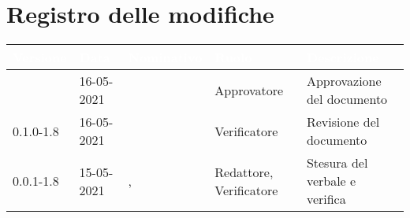 \section*{Registro delle modifiche}
{
\setcounter{table}{-1}
{
\renewcommand{\arraystretch}{1.5}
\centering
\begin{longtable}{C{1.7cm} | C{2.5cm} | C{3.2cm} | C{2.7cm} | C{4.8cm}}
\textcolor{white}{\textbf{Versione}}&
\textcolor{white}{\textbf{Data}}&
\textcolor{white}{\textbf{Nominativo}}&
\textcolor{white}{\textbf{Ruolo}}&
\textcolor{white}{\textbf{Descrizione}}\\	
\endhead

\Versionedoc{} & 16-05-2021 & \Approvatore{} & Approvatore & Approvazione del documento\\	
0.1.0-1.8 & 16-05-2021 & \RA{} & Verificatore & Revisione del documento\\		
0.0.1-1.8 & 15-05-2021 & \Redattori{}, \BM{} & Redattore, Verificatore & Stesura del verbale e verifica\\
		
\end{longtable}
}
}
